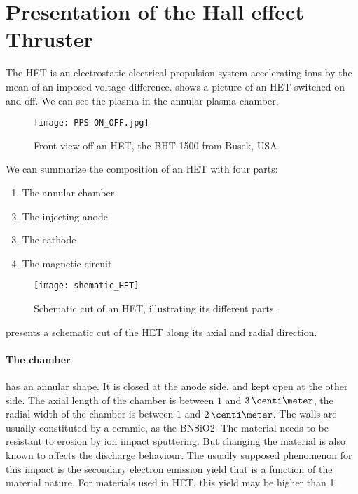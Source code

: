

\section*{Presentation of the Hall effect Thruster }
  \label{sec-HET}

  
  The \ac{HET} is an electrostatic electrical propulsion system accelerating ions by the mean of an imposed voltage difference.
   shows a picture of an \ac{HET} switched on and off.
  We can see the plasma in the annular plasma chamber.


  \begin{figure}[hbtp]
    \centering
    \texttt{[image: PPS-ON\_OFF.jpg]}
    \caption{Front view off an \ac{HET}, the BHT-1500 from Busek, USA}
    \label{fig-bhtonoff}
  \end{figure}

  We can summarize the composition of an \ac{HET} with four parts\string:
  \begin{enumerate}
    \item The annular chamber.
    \item The injecting anode
    \item The cathode
    \item The magnetic circuit
  \end{enumerate}

  \begin{figure}[hbtp]
    \centering
    \texttt{[image: shematic\_HET]}
    \caption{Schematic cut of an \ac{HET}, illustrating its different parts. }
    \label{fig-shematiccut}
  \end{figure}

   presents a schematic cut of the \ac{HET} along its axial and radial direction.

  \paragraph{The chamber} has an annular shape.
  It is closed at the anode side, and kept open at the other side.
  The axial length of the chamber is between $1$ and $3\,\centi\meter$, the radial width of the chamber is between $1$ and $2\,\centi\meter$. 
  The walls are usually constituted by a ceramic, as the \ac{BNSiO2}.
  The material needs to be resistant to erosion by ion impact sputtering.
  But changing the material is also known to affects the discharge behaviour.
  The usually supposed phenomenon for this impact is the secondary electron emission yield that is a function of the material nature.
  For materials used in HET, this yield may be higher than 1.



